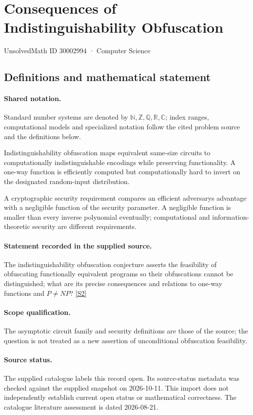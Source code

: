 \documentclass[11pt]{article}
\newcommand{\sref}[2]{\hyperlink{source:#1:#2}{[S#2]}}
\begin{document}
\setcounter{section}{30002993}
\section{Consequences of Indistinguishability Obfuscation}\label{30002994}
{\small\sffamily UnsolvedMath ID 30002994 · Computer Science}
\subsection{Definitions and mathematical statement}

\paragraph{Shared notation.}Standard number systems are denoted by $\mathbb N,\mathbb Z,\mathbb Q,\mathbb R,\mathbb C$; index ranges, computational models and specialized notation follow the cited problem source and the definitions below.


Indistinguishability obfuscation maps equivalent same-size circuits to computationally indistinguishable encodings while preserving functionality. A one-way function is efficiently computed but computationally hard to invert on the designated random-input distribution.

A cryptographic security requirement compares an efficient adversary\textquotesingle s advantage with a negligible function of the security parameter. A negligible function is smaller than every inverse polynomial eventually; computational and information-theoretic security are different requirements.
\paragraph{Statement recorded in the supplied source.}
The indistinguishability obfuscation conjecture asserts the feasibility of obfuscating functionally equivalent programs so their obfuscations cannot be distinguished; what are its precise consequences and relations to one-way functions and $P\neq NP$? \sref{30002994}{2}
\paragraph{Scope qualification.}
The asymptotic circuit family and security definitions are those of the source; the question is not treated as a new assertion of unconditional obfuscation feasibility.
\paragraph{Source status.}
The supplied catalogue labels this record open. Its source-status metadata was checked against the supplied snapshot on 2026-10-11. This import does not independently establish current open status or mathematical correctness. The catalogue literature assessment is dated 2026-08-21.
\end{document}
